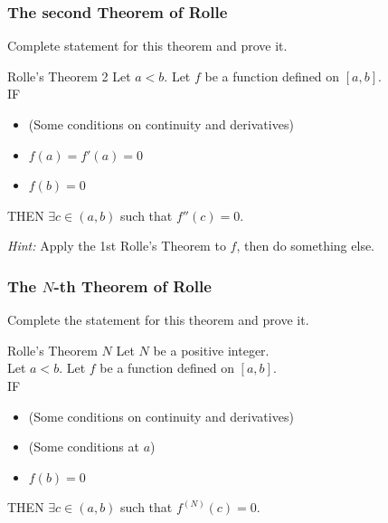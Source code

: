 \documentclass[14pt]{beamer}
\begin{document}
\begin{frame}[t]
	\frametitle{The second Theorem of Rolle}

	Complete statement for this theorem and prove it.

	\vfill

	\begin{block}{Rolle's Theorem 2}
		Let $a<b$. Let $f$ be a function defined on $[a,b]$. \\ IF
		\begin{itemize}
			\item (Some conditions on continuity and derivatives)

			\item $\displaystyle f(a) = f'(a) =0$

			\item $\displaystyle f(b)=0$
		\end{itemize}
		THEN $\displaystyle \exists c \in (a,b)$ such that $\displaystyle f''(c)=0$.
	\end{block}

	\vfill

	\emph{Hint:} Apply the 1st Rolle's Theorem to $f$, then do something else.
\end{frame}

\begin{frame}[t]
	\frametitle{The $N$-th Theorem of Rolle}

	Complete the statement for this theorem and prove it.

	\begin{block}{Rolle's Theorem $N$}
		Let $N$ be a positive integer. \\ Let $a<b$. Let $f$ be a function defined on
		$[a,b]$. \\ IF
		\begin{itemize}
			\item (Some conditions on continuity and derivatives)

			\item (Some conditions at $a$)

			\item $\displaystyle f(b)=0$
		\end{itemize}
		THEN $\displaystyle \exists c \in (a,b)$ such that
		$\displaystyle f^{(N)}(c)=0$.
	\end{block}
\end{frame}
\end{document}
